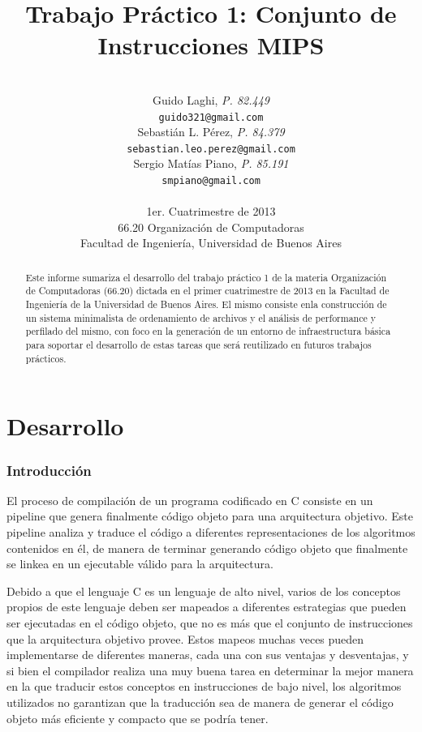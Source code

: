 \documentclass[a4paper,11pt]{article}
\title{\textbf{Trabajo Práctico 1: Conjunto de Instrucciones MIPS}}
\author{\\
  Guido Laghi, \textit{P. 82.449}                                  \\
  \texttt{guido321@gmail.com}                                      \\ [2.5ex]
  Sebastián L. Pérez, \textit{P. 84.379}                           \\
  \texttt{sebastian.leo.perez@gmail.com}                           \\ [2.5ex]
  Sergio Matías Piano, \textit{P. 85.191}                          \\
  \texttt{smpiano@gmail.com}                                       \\ [2.5ex]
                                                                   \\
  \normalsize{1er. Cuatrimestre de 2013}                           \\
  \normalsize{66.20 Organización de Computadoras}                  \\
  \normalsize{Facultad de Ingeniería, Universidad de Buenos Aires} \\
}
\date{}
\begin{document}
\thispagestyle{empty}
\maketitle

\begin{abstract}

  Este informe sumariza el desarrollo del trabajo práctico 1 de la materia
  Organización de Computadoras (66.20) dictada en el primer cuatrimestre de
  2013 en la Facultad de Ingeniería de la Universidad de Buenos Aires. El mismo
  consiste enla construcción de un sistema minimalista de ordenamiento de
  archivos y el análisis de performance y perfilado del mismo, con foco en la
  generación de un entorno de infraestructura básica para soportar el
  desarrollo de estas tareas que será reutilizado en futuros trabajos
  prácticos.

\end{abstract}

\clearpage

\tableofcontents
\clearpage


\part{Desarrollo}

\section{Introducción}

El proceso de compilación de un programa codificado en C consiste en un
pipeline que genera finalmente código objeto para una arquitectura objetivo.
Este pipeline analiza y traduce el código a diferentes representaciones de los
algoritmos contenidos en él, de manera de terminar generando código objeto que
finalmente se linkea en un ejecutable válido para la arquitectura.

Debido a que el lenguaje C es un lenguaje de alto nivel, varios de los
conceptos propios de este lenguaje deben ser mapeados a diferentes estrategias
que pueden ser ejecutadas en el código objeto, que no es más que el conjunto de
instrucciones que la arquitectura objetivo provee. Estos mapeos muchas veces
pueden implementarse de diferentes maneras, cada una con sus ventajas y
desventajas, y si bien el compilador realiza una muy buena tarea en determinar
la mejor manera en la que traducir estos conceptos en instrucciones de bajo
nivel, los algoritmos utilizados no garantizan que la traducción sea de manera
de generar el código objeto más eficiente y compacto que se podría tener.
\end{document}
